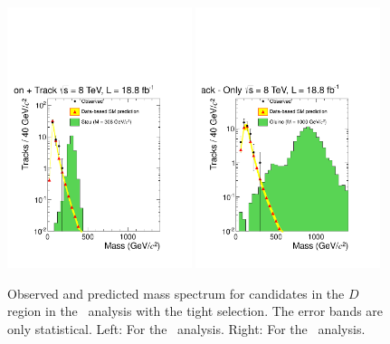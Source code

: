 \begin{figure}
 \begin{center}
  \includegraphics[clip=false, trim=0.0cm 0cm 0.0cm 0cm, width=0.48\textwidth]{figures/tkmu/RescaleNoRatio_Mass_8TeV_TightNoSMMC}
  \includegraphics[clip=false, trim=0.0cm 0cm 0.0cm 0cm, width=0.48\textwidth]{figures/tkonly/RescaleNoRatio_Mass_8TeV_TightNoSMMC}
 \end{center}
 \caption[Observed and predicted mass spectrum for candidates in the signal region with the final selection thresholds in the \tktof\ and \tkonly\ analyses.]
{Observed and predicted mass spectrum for candidates in the $D$ region in the \tktof\ analysis with the tight selection.
The error bands are only statistical. Left: For the \tktof\ analysis. Right: For the \tkonly\ analysis.}
\label{fig:TightMassDistribution}
\end{figure}